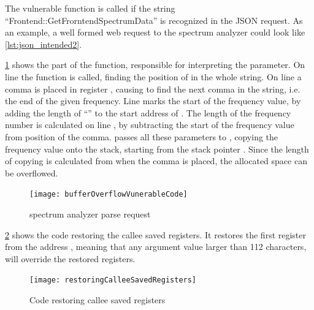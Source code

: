 The vulnerable function is called if the string \enquote{Frontend::GetFrorntendSpectrumData} is recognized in the JSON request.
As an example, a well formed web request to the spectrum analyzer could look like \cref{lst:json_intended2}.



\cref{fig:spectrumAnalyserCode} shows the part of the function, responsible for interpreting the  parameter. 
On line  the function  is called, finding the position of  in the whole string.
On line  a comma is placed in register , causing  to find the next comma in the string, i.e. the end of the given frequency.
Line  marks the start of the frequency value, by adding the length of \enquote{} to the start address of .
The length of the frequency number is calculated on line , by subtracting the start of the frequency value from position of the comma.
 passes all these parameters to , copying the frequency value onto the stack, starting from the stack pointer .
Since the length of copying is calculated from when the comma is placed, the allocated space can be overflowed.

\begin{figure}
  \texttt{[image: bufferOverflowVunerableCode]}
  \caption{spectrum analyzer parse request}
  \label{fig:spectrumAnalyserCode}
\end{figure}

\cref{fig:calleeSavedRegisters} shows the code restoring the callee saved registers.
It restores the first register from the address , meaning that any argument value larger than 112 characters, will override the restored registers.

\begin{figure}
  \texttt{[image: restoringCalleeSavedRegisters]}
  \caption{Code restoring callee saved registers}
  \label{fig:calleeSavedRegisters}
\end{figure}

